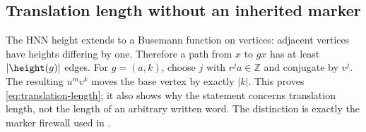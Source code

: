 \subsection{Translation length without an inherited marker}

The HNN height extends to a Busemann function on vertices: adjacent vertices
have heights differing by one.  Therefore a path from $x$ to $gx$ has at
least $|\height(g)|$ edges.  For $g=(a,k)$, choose $j$ with $r^ja\in\mathbb
Z$ and conjugate by $v^j$.  The resulting $u^mv^k$ moves the base vertex by
exactly $|k|$.  This proves \eqref{eq:translation-length}; it also shows why
the statement concerns translation length, not the length of an arbitrary
written word.  The distinction is exactly the marker firewall used in
.
